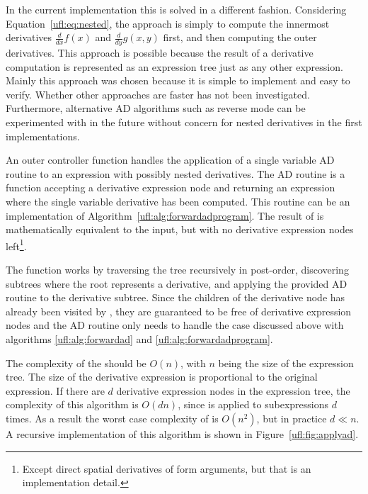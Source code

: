 In the current \ufl{} implementation this is solved in a different
fashion.  Considering Equation~\eqref{ufl:eq:nested}, the approach is
simply to compute the innermost derivatives $\frac{d}{dx} f(x)$ and
$\frac{d}{dy} g(x,y)$ first, and then computing the outer derivatives.
This approach is possible because the result of a derivative
computation is represented as an expression tree just as any other
expression.  Mainly this approach was chosen because it is simple to
implement and easy to verify.  Whether other approaches are faster has
not been investigated.  Furthermore, alternative AD algorithms such as
reverse mode can be experimented with in the future without concern
for nested derivatives in the first implementations.

An outer controller function  handles the application
of a single variable AD routine to an expression with possibly nested
derivatives.  The AD routine is a function accepting a derivative
expression node and returning an expression where the single variable
derivative has been computed.  This routine can be an implementation
of Algorithm~\ref{ufl:alg:forwardadprogram}.  The result of
 is mathematically equivalent to the input, but with
no derivative expression nodes left\footnote{Except direct spatial
derivatives of form arguments, but that is an implementation detail.}.

The function  works by traversing the tree
recursively in post-order, discovering subtrees where the root
represents a derivative, and applying the provided AD routine to the
derivative subtree.  Since the children of the derivative node has
already been visited by , they are guaranteed to be
free of derivative expression nodes and the AD routine only needs to
handle the case discussed above with algorithms
\ref{ufl:alg:forwardad} and
\ref{ufl:alg:forwardadprogram}.

The complexity of the  should be $O(n)$, with $n$
being the size of the expression tree.  The size of the derivative
expression is proportional to the original expression.  If there are
$d$ derivative expression nodes in the expression tree, the complexity
of this algorithm is $O(d n)$, since  is applied to
subexpressions $d$ times.  As a result the worst case complexity of
 is $O(n^2)$, but in practice $d \ll n$.  A recursive
implementation of this algorithm is shown in
Figure~\ref{ufl:fig:applyad}.


